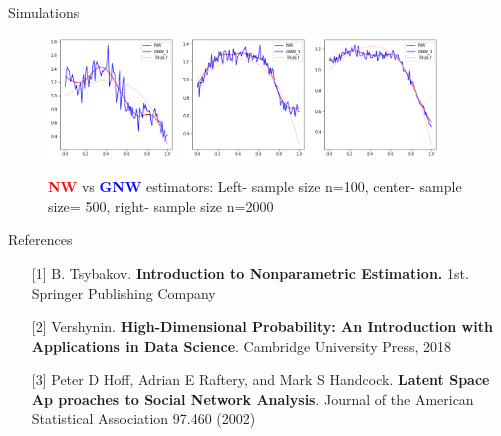 \documentclass[final,dvipsnames]{beamer}
\makeatletter
\newcommand{\myemphh}[1]{\textbf{\textcolor{blue}{#1}}}
\newcommand{\myemphr}[1]{\textbf{\textcolor{red}{#1}}}
\newcommand*{\rom}[1]{\expandafter\@slowromancap\romannumeral #1@}
\makeatother
\begin{document}
\begin{frame}
\begin{columns}[T]
\begin{column}{0.49\textwidth}
\begin{block}{Simulations
    
    \hspace*{\fill}{\large{\rom{6}}\qquad}}
    
    
    \begin{figure}
        \centering
        \includegraphics[width=0.3\textwidth]{trueSMALLsample.png}
        \includegraphics[width=0.3\textwidth]{trueMEDsample.png}
        \includegraphics[width=0.3\textwidth]{trueLARGEsample.png}
        \caption{\myemphr{NW} vs \myemphh{GNW} estimators: Left- sample size n=100, center- sample size= 500, right- sample size n=2000}
    \end{figure}
    
\end{block}



\begin{block}{References}
    {\footnotesize
    \begin{itemize}
    \item[{[1]}] B. Tsybakov. \textbf{Introduction to Nonparametric Estimation.} 1st.
    Springer Publishing Company
    \item[{[2]}] Vershynin. \textbf{High-Dimensional Probability: An Introduction with Applications in Data Science}. Cambridge University Press, 2018
    \item[{[3]}] Peter D Hoff, Adrian E Raftery, and Mark S Handcock. \textbf{Latent Space Ap
    proaches to Social Network Analysis}. Journal of the American Statistical
    Association 97.460 (2002)
    \end{itemize}
    }
\end{block}
\end{column}
\end{columns}
\end{frame}
\end{document}
